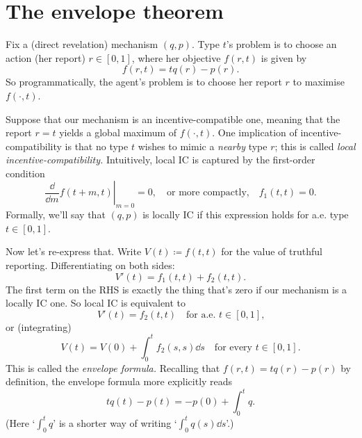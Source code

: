 \section{The envelope theorem}
\label{sec:ch1:env}

Fix a (direct revelation) mechanism $(q,p)$.
Type $t$'s problem is to choose an action (her report) $r \in [0,1]$, where her objective $f(r,t)$ is given by
%
\begin{equation*}
	f(r,t) = t q(r) - p(r) .
\end{equation*}
%
So programmatically, the agent's problem is to choose her report $r$ to maximise $f(\cdot,t)$.

Suppose that our mechanism is an incentive-compatible one,
meaning that the report $r=t$ yields a global maximum of $f(\cdot,t)$.
One implication of incentive-compatibility is that no type $t$ wishes to mimic a \emph{nearby} type $r$; this is called \emph{local incentive-compatibility.}
Intuitively, local IC is captured by the first-order condition
%
\begin{equation*}
	\left. \frac{\dd}{\dd m} f( t+m, t ) \right|_{m=0} = 0 ,
	\quad \text{or more compactly,} \quad
	f_1(t,t)=0 .
\end{equation*}
%
Formally, we'll say that $(q,p)$ is locally IC if this expression holds for a.e. type $t \in [0,1]$.


Now let's re-express that.
Write $V(t) \coloneqq f(t,t)$ for the value of truthful reporting.
Differentiating on both sides:
%
\begin{equation*}
	V'(t)
	= f_1(t,t) + f_2(t,t) .
\end{equation*}
%
The first term on the RHS is exactly the thing that's zero if our mechanism is a locally IC one.
So local IC is equivalent to
%
\begin{equation*}
	V'(t) = f_2(t,t)
	\quad \text{for a.e. $t \in [0,1]$,}
\end{equation*}
%
or (integrating)
%
\begin{equation*}
	V(t) = V(0) + \int_0^t f_2(s,s) \dd s
	\quad \text{for every $t \in [0,1]$.}
\end{equation*}
%
This is called the \emph{envelope formula.}
Recalling that $f(r,t) = t q(r) - p(r)$ by definition,
the envelope formula more explicitly reads
%
\begin{equation*}
	t q(t) - p(t) = - p(0) + \int_0^t q .
\end{equation*}
%
(Here `$\int_0^t q$' is a shorter way of writing `$\int_0^t q(s) \dd s$'.)


